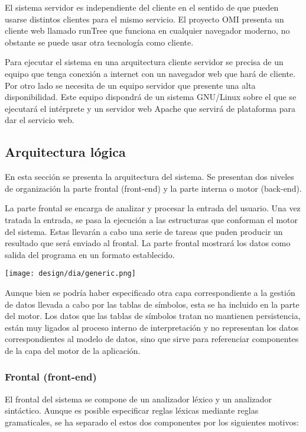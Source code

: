 El sistema servidor es independiente del cliente en el sentido de que pueden usarse distintos clientes para el mismo servicio. El proyecto OMI presenta un cliente web llamado runTree 
que funciona en cualquier navegador moderno, no obstante se puede usar otra tecnología como cliente. 

Para ejecutar el sistema en una arquitectura cliente servidor se precisa de un equipo que tenga conexión a internet con un navegador web que hará de cliente. Por otro lado se necesita de un equipo servidor
que presente una alta disponibilidad. Este equipo dispondrá de un sistema GNU/Linux sobre el que se ejecutará el intérprete y un servidor web Apache que servirá de plataforma para dar el servicio web.

\subsection {Arquitectura lógica}
En esta sección se presenta la arquitectura del sistema. Se presentan 
dos niveles de organización la parte frontal (front-end) y la parte 
interna o motor (back-end). 

La parte frontal se encarga de analizar y procesar la entrada del usuario.
Una vez tratada la entrada, se pasa la ejecución a las estructuras que conforman 
el motor del sistema. Estas llevarán a cabo una serie de tareas que puden producir
un resultado que será enviado al frontal. La parte frontal mostrará 
los datos como salida del programa en un formato establecido.

\begin{center}
\texttt{[image: design/dia/generic.png]} 
\end{center}

Aunque bien se podría haber especificado otra capa correspondiente a la gestión de datos
llevada a cabo por las tablas de símbolos, esta se ha incluido en la parte del motor. Los datos que 
las tablas de símbolos tratan no mantienen persistencia, están muy ligados al proceso interno de 
interpretación y no representan los datos correspondientes al modelo de datos, sino que sirve para
referenciar componentes de la capa del motor de la aplicación.

\subsubsection{Frontal (front-end)}
El frontal del sistema se compone de un analizador léxico y un analizador sintáctico. 
Aunque es posible especificar reglas léxicas mediante reglas gramaticales, se ha separado el 
estos dos componentes por los siguientes motivos:

